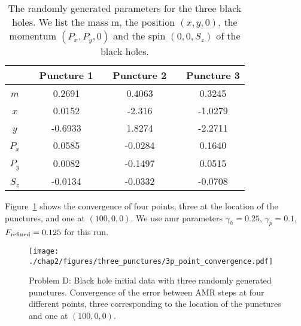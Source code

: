 \begin{table}
\centering
\label{tab:Multi_Punctures}
\begin{tabular}{cccc}
\hline
 \,\,\,\, & Puncture 1  \,\,\,\, & Puncture 2  \,\,\,\, & Puncture 3 \\ \hline
  $m$ \,\,\,\, &0.2691  \,\,\,\, & 0.4063  \,\,\,\, & 0.3245  \\
  $x$ \,\,\,\, &0.0152  \,\,\,\, & -2.316  \,\,\,\, & -1.0279  \\
  $y$ \,\,\,\, &-0.6933  \,\,\,\, & 1.8274  \,\,\,\, &  -2.2711  \\ 
  $P_x$ \,\,\,\, &0.0585  \,\,\,\, & -0.0284  \,\,\,\, &  0.1640 \\
  $P_y$ \,\,\,\, &0.0082  \,\,\,\, &  -0.1497 \,\,\,\, &  0.0515 \\
  $S_z$ \,\,\,\, &-0.0134  \,\,\,\, &  -0.0332  \,\,\,\, & -0.0708 \\ \hline
\end{tabular}
\caption{
  The randomly generated parameters for the three black holes.  We list the mass m, the position $(x,y,0)$, the momentum $(P_x, P_y, 0)$ and the spin $(0,0,S_z)$ of the black holes.
}
\end{table}

Figure~\ref{fig:three_punctures_convergence} shows the convergence of four points, three at the location of the punctures, and one at $(100,0,0)$. We use amr parameters $\gamma_h=0.25$, $\gamma_p=0.1$, $F_{\rm refined}=0.125$ for this run.

\begin{figure}[H]
  \centering
  \texttt{[image: ./chap2/figures/three\_punctures/3p\_point\_convergence.pdf]}
  \caption{Problem D: Black hole initial data with three randomly generated punctures.  Convergence of the error between AMR steps at four different points, three corresponding to the location of the punctures and one at $(100,0,0)$.
  }
  \label{fig:three_punctures_convergence} 
\end{figure}

